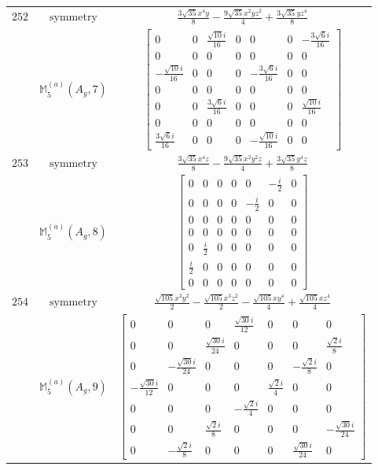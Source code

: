 \documentclass[fleqn,8pt,landscape]{jsarticle}
\begin{document}
\begin{longtable}{ccc}
$ 252 $ & $ \text{symmetry} $ & $ \frac{3 \sqrt{35} x^{4} y}{8} - \frac{9 \sqrt{35} x^{2} y z^{2}}{4} + \frac{3 \sqrt{35} y z^{4}}{8} $ \\
$  $ & $ \mathbb{M}_{5}^{(a)}(A_{g},7) $ & $ \begin{bmatrix} 0 & 0 & \frac{\sqrt{10} i}{16} & 0 & 0 & 0 & - \frac{3 \sqrt{6} i}{16} \\ 0 & 0 & 0 & 0 & 0 & 0 & 0 \\ - \frac{\sqrt{10} i}{16} & 0 & 0 & 0 & - \frac{3 \sqrt{6} i}{16} & 0 & 0 \\ 0 & 0 & 0 & 0 & 0 & 0 & 0 \\ 0 & 0 & \frac{3 \sqrt{6} i}{16} & 0 & 0 & 0 & \frac{\sqrt{10} i}{16} \\ 0 & 0 & 0 & 0 & 0 & 0 & 0 \\ \frac{3 \sqrt{6} i}{16} & 0 & 0 & 0 & - \frac{\sqrt{10} i}{16} & 0 & 0 \end{bmatrix} $ \\ \hline
$ 253 $ & $ \text{symmetry} $ & $ \frac{3 \sqrt{35} x^{4} z}{8} - \frac{9 \sqrt{35} x^{2} y^{2} z}{4} + \frac{3 \sqrt{35} y^{4} z}{8} $ \\
$  $ & $ \mathbb{M}_{5}^{(a)}(A_{g},8) $ & $ \begin{bmatrix} 0 & 0 & 0 & 0 & 0 & - \frac{i}{2} & 0 \\ 0 & 0 & 0 & 0 & - \frac{i}{2} & 0 & 0 \\ 0 & 0 & 0 & 0 & 0 & 0 & 0 \\ 0 & 0 & 0 & 0 & 0 & 0 & 0 \\ 0 & \frac{i}{2} & 0 & 0 & 0 & 0 & 0 \\ \frac{i}{2} & 0 & 0 & 0 & 0 & 0 & 0 \\ 0 & 0 & 0 & 0 & 0 & 0 & 0 \end{bmatrix} $ \\ \hline
$ 254 $ & $ \text{symmetry} $ & $ \frac{\sqrt{105} x^{3} y^{2}}{2} - \frac{\sqrt{105} x^{3} z^{2}}{2} - \frac{\sqrt{105} x y^{4}}{4} + \frac{\sqrt{105} x z^{4}}{4} $ \\
$  $ & $ \mathbb{M}_{5}^{(a)}(A_{g},9) $ & $ \begin{bmatrix} 0 & 0 & 0 & \frac{\sqrt{30} i}{12} & 0 & 0 & 0 \\ 0 & 0 & \frac{\sqrt{30} i}{24} & 0 & 0 & 0 & \frac{\sqrt{2} i}{8} \\ 0 & - \frac{\sqrt{30} i}{24} & 0 & 0 & 0 & - \frac{\sqrt{2} i}{8} & 0 \\ - \frac{\sqrt{30} i}{12} & 0 & 0 & 0 & \frac{\sqrt{2} i}{4} & 0 & 0 \\ 0 & 0 & 0 & - \frac{\sqrt{2} i}{4} & 0 & 0 & 0 \\ 0 & 0 & \frac{\sqrt{2} i}{8} & 0 & 0 & 0 & - \frac{\sqrt{30} i}{24} \\ 0 & - \frac{\sqrt{2} i}{8} & 0 & 0 & 0 & \frac{\sqrt{30} i}{24} & 0 \end{bmatrix} $ \\ \hline

\end{longtable}
\end{document}
